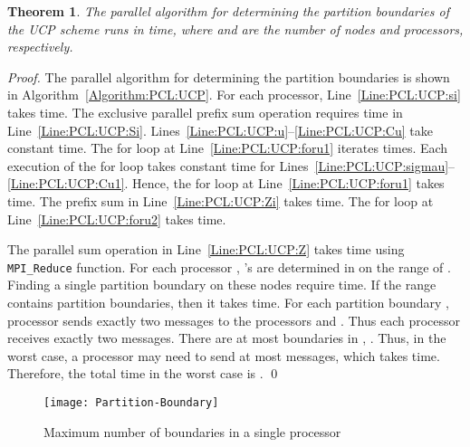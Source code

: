 \documentclass[conference,letterpaper,10pt]{IEEEtran}
\newtheorem{theorem}{Theorem}
\begin{document}
\begin{theorem} \label{thm:ucptime}
The parallel algorithm for determining the partition boundaries of the UCP scheme runs in  time, where  and  are the number of nodes and processors, respectively.
\end{theorem}
\begin{proof}
The parallel algorithm for determining the partition boundaries is shown in  Algorithm~\ref{Algorithm:PCL:UCP}. 
For each processor, Line~\ref{Line:PCL:UCP:si} takes  time. The exclusive parallel prefix sum operation requires  time in Line~\ref{Line:PCL:UCP:Si}. Lines~\ref{Line:PCL:UCP:u}--\ref{Line:PCL:UCP:Cu} take constant time. The for loop at Line~\ref{Line:PCL:UCP:foru1} iterates  times. Each execution of the for loop takes constant time for Lines~\ref{Line:PCL:UCP:sigmau}--\ref{Line:PCL:UCP:Cu1}. Hence, the for loop at Line~\ref{Line:PCL:UCP:foru1} takes  time. The prefix sum in Line~\ref{Line:PCL:UCP:Zi} takes  time. The for loop at Line~\ref{Line:PCL:UCP:foru2} takes  time.

The parallel sum operation in Line~\ref{Line:PCL:UCP:Z} takes  time using \texttt{MPI\_Reduce} function.
For each processor , 's are determined in  on the range of . Finding a single partition boundary on these  nodes require  time.
If the range contains  partition boundaries, then it takes   time.
For each partition boundary , processor  sends exactly two messages to the processors  and . Thus each processor receives exactly two messages. There are at most  boundaries in , . Thus, in the worst case, a processor may need to send at most  messages, which takes  time. Therefore, the total time in the worst case is .
\qed
\end{proof}

\begin{figure}[b]
\centering
{\texttt{[image: Partition-Boundary]}}
\caption{Maximum number of boundaries in a single processor}
\label{Figure:PCL:FirstBlock}
\end{figure}
\end{document}

